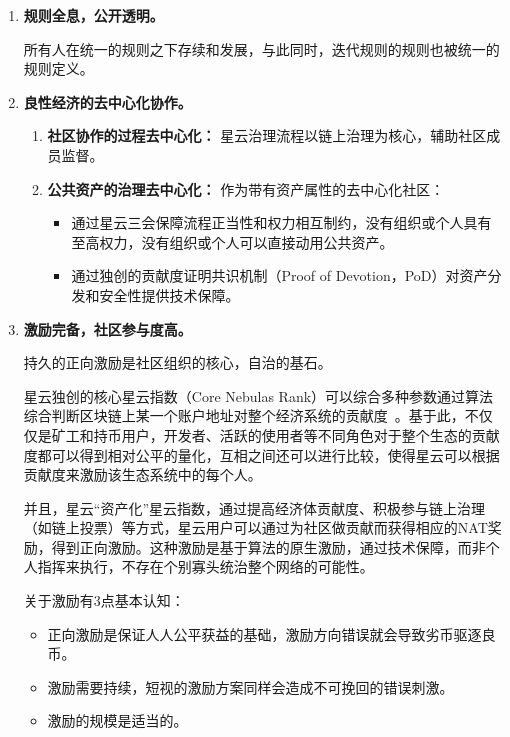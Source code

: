 \begin{enumerate}
	\item 

	\textbf{规则全息，公开透明。} 

	所有人在统一的规则之下存续和发展，与此同时，迭代规则的规则也被统一的规则定义。


	\item 

	\textbf{良性经济的去中心化协作。}

	\begin{enumerate}
		\item 

		\textbf{社区协作的过程去中心化：} 星云治理流程以链上治理为核心，辅助社区成员监督。
	
		\item 

		\textbf{公共资产的治理去中心化：} 作为带有资产属性的去中心化社区：

		\begin{itemize}
			\item 通过星云三会保障流程正当性和权力相互制约，没有组织或个人具有至高权力，没有组织或个人可以直接动用公共资产。
			\item 通过独创的贡献度证明共识机制（Proof of Devotion，PoD）对资产分发和安全性提供技术保障。
		\end{itemize}

	\end{enumerate}

	\item 

	\textbf{激励完备，社区参与度高。}
	
	持久的正向激励是社区组织的核心，自治的基石。

	星云独创的核心星云指数（Core Nebulas Rank）可以综合多种参数通过算法综合判断区块链上某一个账户地址对整个经济系统的贡献度~\cite{yellowpaper}。基于此，不仅仅是矿工和持币用户，开发者、活跃的使用者等不同角色对于整个生态的贡献度都可以得到相对公平的量化，互相之间还可以进行比较，使得星云可以根据贡献度来激励该生态系统中的每个人。

	并且，星云“资产化”星云指数，通过提高经济体贡献度、积极参与链上治理（如链上投票）等方式，星云用户可以通过为社区做贡献而获得相应的NAT奖励，得到正向激励。这种激励是基于算法的原生激励，通过技术保障，而非个人指挥来执行，不存在个别寡头统治整个网络的可能性。

	关于激励有3点基本认知：

	\begin{itemize}
		\item 正向激励是保证人人公平获益的基础，激励方向错误就会导致劣币驱逐良币。
		\item 激励需要持续，短视的激励方案同样会造成不可挽回的错误刺激。
		\item 激励的规模是适当的。
	\end{itemize}


\end{enumerate}
